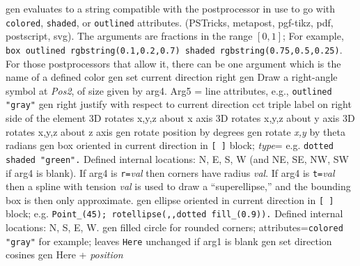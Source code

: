   {gen}
  {evaluates to a string compatible with the postprocessor in use
   to go with {\tt colored}, {\tt shaded}, or {\tt outlined} attributes.
   (PSTricks, metapost, pgf-tikz, pdf, postscript, svg).
   The arguments are fractions
   in the range $[0,1]$; For example,
   {\tt box outlined rgbstring(0.1,0.2,0.7) shaded rgbstring(0.75,0.5,0.25)}.
   For those postprocessors that allow it,
   there can be one argument which is the name of a defined color}
  {gen}
  {set current direction right }
  {gen}
  {Draw a right-angle symbol at {\sl Pos2}, of size given by arg4. Arg5 =
   line attributes, e.g., {\tt outlined "gray"}}
  {gen}
  {right justify with respect to current direction}
  {cct}
  {triple label on right side of the element }
  {3D}
  {rotates x,y,z about x axis}
  {3D}
  {rotates x,y,z about y axis}
  {3D}
  {rotates x,y,z about z axis}
  {gen}
  {rotate position by degrees}
  {gen}
  {rotate {\sl x,y} by theta radians}
  {gen}
  {box oriented in current direction in {\tt [ ]} block;
   {\sl type}= e.g. {\tt dotted shaded "green".}  Defined
   internal locations: N, E, S, W (and NE, SE, NW, SW if arg4 is blank).
   If arg4 is {\tt r=}{\sl val} then corners have radius {\sl val}.
   If arg4 is {\tt t=}{\sl val} then a spline with tension {\sl val}
   is used to draw a ``superellipse,'' and the bounding box is then
   only approximate. }
  {gen}
  {ellipse oriented in current direction in {\tt [ ]} block;
   e.g. {\tt Point\_(45); rotellipse(,{},dotted fill\_(0.9)).} Defined internal
   locations: N, S, E, W.}
  {gen}
  {filled circle for rounded corners; attributes={\tt colored "gray"} 
   for example; leaves {\tt Here} unchanged if arg1 is blank
    }
  {gen}
  {set direction cosines}
  {gen}
  {Here + {\sl position}}

